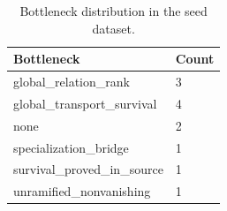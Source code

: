 \begin{table}[h]
\centering
\caption{Bottleneck distribution in the seed dataset.}
\label{tab:bottleneck-summary}
\footnotesize
\begin{tabular}{|p{}|p{}|}
\hline
Bottleneck & Count \\
\hline
global\_\allowbreak{}relation\_\allowbreak{}rank & 3 \\
global\_\allowbreak{}transport\_\allowbreak{}survival & 4 \\
none & 2 \\
specialization\_\allowbreak{}bridge & 1 \\
survival\_\allowbreak{}proved\_\allowbreak{}in\_\allowbreak{}source & 1 \\
unramified\_\allowbreak{}nonvanishing & 1 \\
\hline
\end{tabular}
\end{table}
